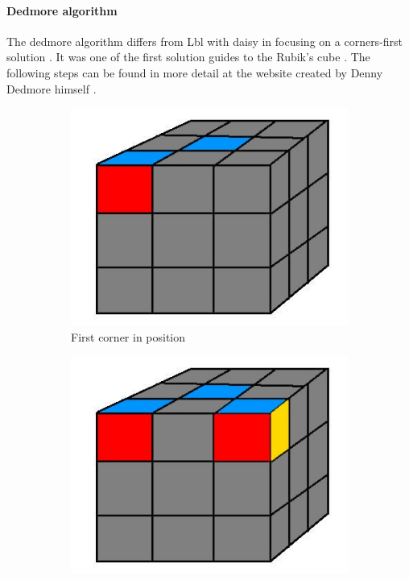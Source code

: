 \documentclass[a4paper,11pt]{kth-mag}
\begin{document}
\paragraph{Dedmore algorithm}
The dedmore algorithm differs from Lbl with daisy in focusing on a corners-first solution \cite{Dedmore}. It was one of the first solution guides to the Rubik's cube \cite{Ijsat}. The following steps can be found in more detail at the website created by Denny Dedmore himself \cite{Dedmore}.\\
\begin{figure}[b]
	\centering
	\begin{subfigure}[!b]{0.3\textwidth}
		\includegraphics[width=\textwidth]{figs/rubiks-frst-corner.jpg}
		\caption{First corner in position}
		\label{fig_9}
	\end{subfigure}
	\begin{subfigure}[!b]{0.3\textwidth}
		\includegraphics[width=\textwidth]{figs/rubiks-scnd-corner.jpg}

\end{subfigure}
\end{figure}
\end{document}
